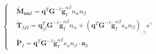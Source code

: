 \begin{equation}
\left \{
\begin{split}
&\tilde{\boldsymbol M}_{\boldsymbol{nn} I} = \boldsymbol q^T \boldsymbol G^{-1}\tilde{\boldsymbol g}^{\alpha\beta}_I n_\alpha n_\beta \\
&\tilde{\boldsymbol T}_{M I} = \boldsymbol q^T_{\vert \beta} \boldsymbol G^{-1}\tilde{\boldsymbol g}^{\alpha\beta}_I n_\alpha + (\boldsymbol q^T \boldsymbol G^{-1}\tilde{\boldsymbol g}^{\alpha\beta}_I s_\alpha n_\beta)_{,\gamma}s^\gamma \\
&\tilde{\boldsymbol P}_I = \boldsymbol q^T \boldsymbol G^{-1}\tilde{\boldsymbol g}^{\alpha\beta}_I s_\alpha n_\beta \cdot \boldsymbol a_3
\end{split}
\right .
\end{equation}
